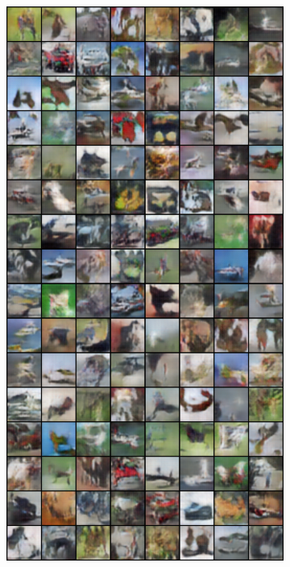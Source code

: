 \begin{figure}[H]
\begin{subfigure}{0.2\textwidth}
        \centering
        \includegraphics[width=0.95\linewidth]{cifar10/64/fake_sample_epoch_0020.png}
        \caption{}
        \label{subfig:cifar10/64/fake_sample_epoch_0020}
    \end{subfigure}%

\end{figure}
